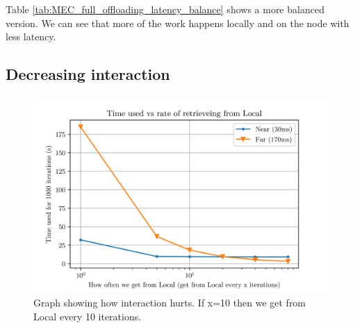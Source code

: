 Table \ref{tab:MEC_full_offloading_latency_balance} shows a more balanced version. We can see that more of the work happens locally and on the node with less latency.

\subsection{Decreasing interaction}

\begin{figure}[t]
    \centering
    \includegraphics[scale=1]{chapters/evaluation/figures/times.png}
    \caption{Graph showing how interaction hurts. If x=10 then we get from Local every 10 iterations.}
    \label{fig:time_graph_near_far}
\end{figure}

